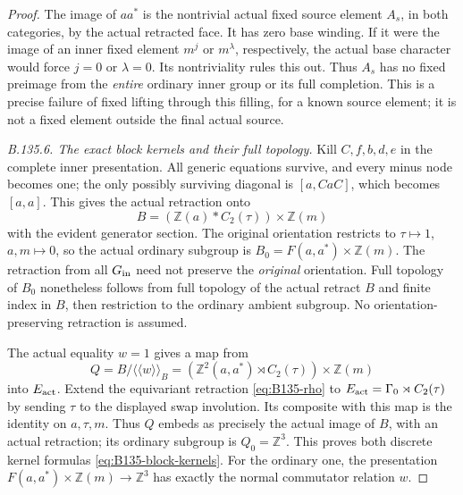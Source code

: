\begin{proof}
The image of $aa^*$ is the nontrivial actual fixed source element
$A_s$, in both categories, by the actual retracted face. It has
zero base winding. If it were the image of an inner fixed element
$m^j$ or $m^\lambda$, respectively, the actual base character
would force $j=0$ or $\lambda=0$. Its nontriviality rules this out.
Thus $A_s$ has no fixed preimage from the \emph{entire} ordinary
inner group or its full completion. This is a precise failure of
fixed lifting through this filling, for a known source element;
it is not a fixed element outside the final actual source.

\emph{B.135.6. The exact block kernels and their full topology.}
Kill $C,f,b,d,e$ in the complete inner presentation. All
generic equations survive, and every minus node becomes one;
the only possibly surviving diagonal is $[a,CaC]$, which
becomes $[a,a]$. This gives the actual retraction onto
\[
 B=(\mathbb Z(a)*C_2(\tau))\times\mathbb Z(m)
\]
with the evident generator section. The original orientation
restricts to $\tau\mapsto1$, $a,m\mapsto0$, so the actual
ordinary subgroup is $B_0=F(a,a^*)\times\mathbb Z(m)$.
The retraction from all $G_{\rm in}$ need not preserve the
\emph{original} orientation. Full topology of $B_0$ nonetheless
follows from full topology of the actual retract $B$ and
finite index in $B$, then restriction to the ordinary ambient
subgroup. No orientation-preserving retraction is assumed.

The actual equality $w=1$ gives a map from
\[
 Q=B/\langle\!\langle w\rangle\!\rangle_B
   =(\mathbb Z^2(a,a^*)\rtimes C_2(\tau))\times\mathbb Z(m)
\]
into $E_{\rm act}$. Extend the equivariant retraction
\eqref{eq:B135-rho} to $E_{\rm act}=\Gamma_0\rtimes C_2(\tau)$
by sending $\tau$ to the displayed swap involution. Its
composite with this map is the identity on $a,\tau,m$.
Thus $Q$ embeds as precisely the actual image of $B$, with
an actual retraction; its ordinary subgroup is $Q_0=\mathbb Z^3$.
This proves both discrete kernel formulas
\eqref{eq:B135-block-kernels}. For the ordinary one, the
presentation $F(a,a^*)\times\mathbb Z(m)\to\mathbb Z^3$
has exactly the normal commutator relation $w$.


\end{proof}
